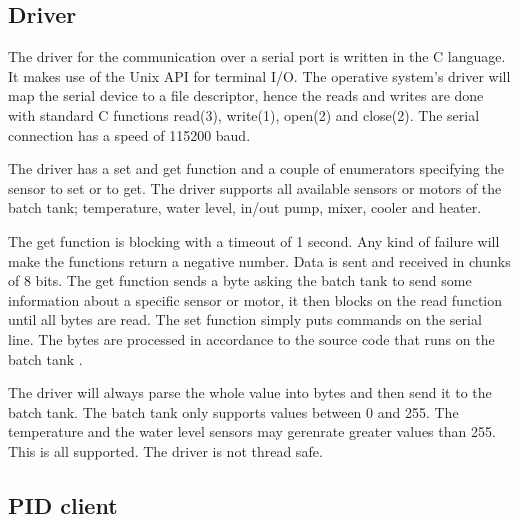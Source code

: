 \documentclass{article}
\begin{document}
\subsection{Driver}
The driver for the communication over a serial port is written in the C language.
It makes use of the Unix API for terminal I/O. The operative system's driver will
map the serial device to a file descriptor, hence the reads and writes are done
with standard C functions read(3), write(1), open(2) and close(2).  The serial
connection has a speed of 115200 baud. 

The driver has a set and get function and a couple of enumerators specifying the
sensor to set or to get. The driver supports all available sensors or motors of
the batch tank; temperature, water level, in/out pump, mixer, cooler and heater.

The get function is blocking with a timeout of 1 second. Any kind of failure will
make the functions return a negative number. Data is sent and received in chunks
of 8 bits. The get function sends a byte asking the batch tank to send some
information about a specific sensor or motor, it then blocks on the read function
until all bytes are read. The set function simply puts commands on the serial
line. The bytes are processed in accordance to the source code that runs on the
batch tank \cite[line 150-223]{kokare.c}. 

The driver will always parse the whole value into bytes and then send it to the
batch tank. The batch tank only supports values between 0 and 255. The
temperature and the water level sensors may gerenrate greater values than 255.
This is all supported. The driver is not thread safe.

\subsection{PID client}
\end{document}
